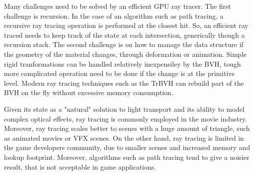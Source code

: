Many challenges need to be solved by an efficient GPU ray tracer. The first challenge is recursion. In the case of an algorithm such as path tracing, a recursive ray tracing operation is performed at the closest hit. So, an efficient ray traced needs to keep track of the state at each intersection, generically though a recursion stack. The second challenge is on how to manage the data structure if the geometry of the material changes, through deformation or animation. Simple rigid tranformations can be handled relatively inexpensiley by the BVH, tough more complicated operation need to be done if the change is at the primitive level. Modern ray tracing techniques such as the TrBVH can rebuild part of the BVH on the fly without excessive memory consumption. 

Given its state as a "natural" solution to light transport and its ability to model complex optical effects, ray tracing is commonly employed in the movie industry. Moreover, ray tracing scales better to scenes with a huge amount of triangle, such as animated movies or VFX scenes. On the other hand, ray tracing is limited in the game developers community, due to smaller scenes and increased memory and lookup footprint. Moreover, algorithms such as path tracing tend to give a noisier result, that is not acceptable in game applications. 


